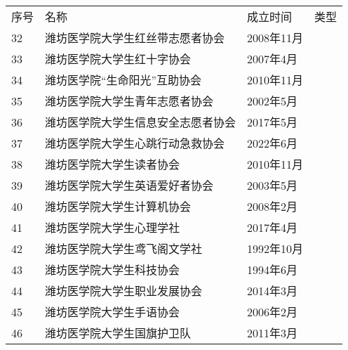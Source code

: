 \newpage
\begin{center}
    \begin{tabular}{|>{\centering\arraybackslash}p{2em}|>{\centering\arraybackslash}p{22em}|%
        >{\centering\arraybackslash}p{6em}|>{\centering\arraybackslash}p{5em}|}
        \Xhline{1.2pt}
        序号 & 名称                & 成立时间     & 类型                     \\
        \Xhline{1.2pt}
        32 & 潍坊医学院大学生红丝带志愿者协会  & 2008年11月 & \multirow{6}{*}{志愿公益类} \\
        \cline{1-3}
        33 & 潍坊医学院大学生红十字协会     & 2007年4月  &                        \\
        \cline{1-3}
        34 & 潍坊医学院“生命阳光”互助协会   & 2010年11月 &                        \\
        \cline{1-3}
        35 & 潍坊医学院大学生青年志愿者协会   & 2002年5月  &                        \\
        \cline{1-3}
        36 & 潍坊医学院大学生信息安全志愿者协会 & 2017年5月  &                        \\
        \cline{1-3}
        37 & 潍坊医学院大学生心跳行动急救协会  & 2022年6月  &                        \\
        \Xhline{1.2pt}
        38 & 潍坊医学院大学生读者协会      & 2010年11月 & \multirow{5}{*}{学术科技类} \\
        \cline{1-3}
        39 & 潍坊医学院大学生英语爱好者协会   & 2003年5月  &                        \\
        \cline{1-3}
        40 & 潍坊医学院大学生计算机协会     & 2008年2月  &                        \\
        \cline{1-3}
        41 & 潍坊医学院大学生心理学社      & 2017年4月  &                        \\
        \cline{1-3}
        42 & 潍坊医学院大学生鸢飞阁文学社    & 1992年10月 &                        \\
        \Xhline{1.2pt}
        43 & 潍坊医学院大学生科技协会      & 1994年6月  & \multirow{2}{*}{创新创业类} \\
        \cline{1-3}
        44 & 潍坊医学院大学生职业发展协会    & 2014年3月  &                        \\
        \Xhline{1.2pt}
        45 & 潍坊医学院大学生手语协会      & 2006年2月  & \multirow{7}{*}{自律互助类} \\
        \cline{1-3}
        46 & 潍坊医学院大学生国旗护卫队     & 2011年3月  &                        \\

\end{tabular}
\end{center}
